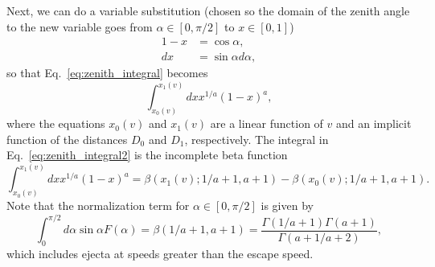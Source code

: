 \documentclass{hitec}
\numberwithin{equation}{section}
\begin{document}
%

Next, we can do a variable substitution (chosen so the domain of the zenith angle to the new variable goes from $\alpha\in [0,\pi/2]$ to $x\in [0,1]$)
\begin{align}
1-x &= \cos\alpha,\\
dx &= \sin\alpha d\alpha,
\end{align}
so that Eq.\ \eqref{eq:zenith_integral} becomes
\begin{equation}\label{eq:zenith_integral2}
\int_{x_0(v)}^{x_1(v)}dx x^{1/a}(1-x)^a,
\end{equation}
where the equations $x_0(v)$ and $x_1(v)$ are a linear function of $v$ and an implicit function of the distances $D_0$ and $D_1$, respectively. The integral in Eq.\ \eqref{eq:zenith_integral2} is the incomplete beta function
\begin{equation}\label{eq:zenith_integral3}
\int_{x_0(v)}^{x_1(v)}dx x^{1/a}(1-x)^a
= \beta(x_1(v); 1/a+1, a+1) - \beta(x_0(v); 1/a+1, a+1).
\end{equation}
Note that the normalization term for $\alpha\in [0, \pi/2]$ is given by
\begin{equation}
\int_{0}^{\pi/2}d\alpha\sin\alpha F(\alpha) = 
\beta(1/a+1, a+1) = \frac{\Gamma(1/a+1)\Gamma(a+1)}{\Gamma(a+1/a+2)},
\end{equation}
which includes ejecta at speeds greater than the escape speed.
\end{document}
